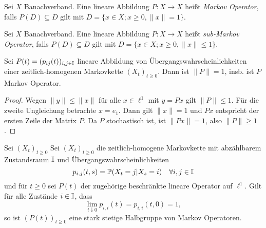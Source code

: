 \documentclass[a4paper]{paper}
\numberwithin{equation}{satz}
\begin{document}
\begin{defi}
Sei $X$ Banachverband. Eine lineare Abbildung $P\colon X\to X$ heißt   \textit{Markov Operator}, falls $P(D)\subseteq D$ gilt mit $D=\{x\in X;x\geq 0, \|x\|=1\}$.
\end{defi}

\begin{defi}
Sei $X$ Banachverband. Eine lineare Abbildung $P\colon X\to X$ heißt   \textit{sub-Markov Operator}, falls $P(D)\subseteq D$ gilt mit $D=\{x\in X; x\geq0, \|x\|\leq1\}$. 
\end{defi}

\begin{prop}
  Sei $P(t)=(p_{ij}(t))_{i,j\in\mathbb{I}}$ lineare Abbildung von Übergangswahrscheinlichkeiten einer zeitlich-homogenen Markovkette $(X_t)_{t\geq0}$. Dann ist $\|P\|=1$, insb. ist $P$ Markov Operator. 
\end{prop}

\begin{proof}
Wegen $\|y\|\leq \|x\|$ für alle $x\in\ell^1$ mit $y=Px$ gilt $\|P\|\leq 1$. Für die zweite Ungleichung betrachte $x=e_1$. Dann gilt $\|x\|=1$ und $Px$ entspricht der ersten Zeile der Matrix $P$. Da $P$ stochastisch ist, ist $\|Px\|=1$, also $\|P\|\geq 1$. 
\end{proof}


\begin{prop}
   Sei $(X_t)_{t\geq0}$ Sei $(X_t)_{t\geq0}$ die zeitlich-homogene Markovkette  mit abzählbarem Zustandsraum $\mathbb{I}$ und Übergangswahrscheinlichkeiten $$p_{i,j}(t,s)=\mathbb{P}(X_t=j| X_s=i)\quad \forall i,j\in \mathbb{I}$$ und für $t\geq0$ sei $P(t)$ der zugehörige beschränkte lineare Operator auf $\ell^1$. Gilt für alle Zustände $i\in\mathbb{I}$, dass $$\lim_{t\downarrow 0}p_{i,i}(t)=p_{i,i}(t,0)=1,$$so ist $(P(t))_{t\geq0}$ eine stark stetige Halbgruppe von Markov Operatoren.
\end{prop}
\end{document}
